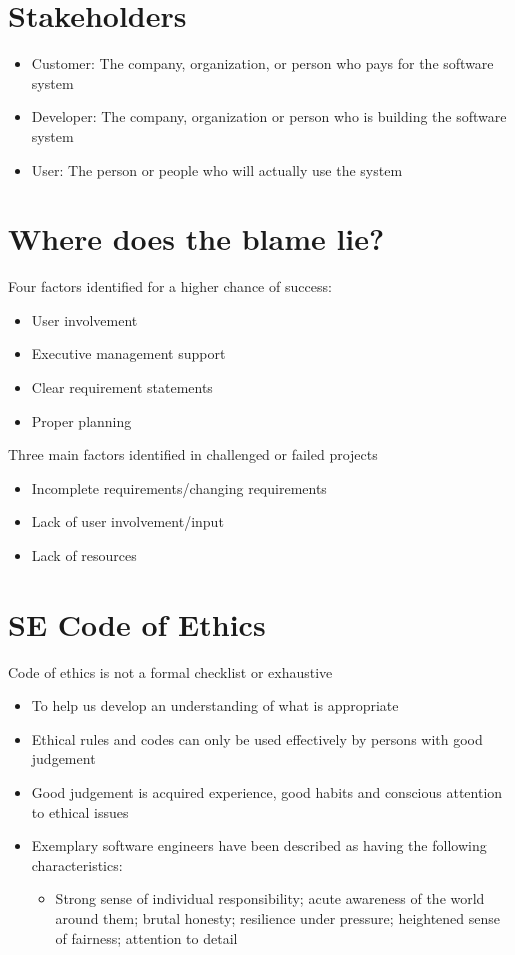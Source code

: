 \documentclass{article}[18pt]
\begin{document}
\section{Stakeholders}
\begin{itemize}
	\item Customer: The company, organization, or person who pays for the software system
	\item Developer: The company, organization or person who is building the software system
	\item User: The person or people who will actually use the system
\end{itemize}
\section{Where does the blame lie?}
Four factors identified for a higher chance of success:
\begin{itemize}
	\item User involvement
	\item Executive management support
	\item Clear requirement statements
	\item Proper planning
\end{itemize}
Three main factors identified in challenged or failed projects
\begin{itemize}
	\item Incomplete requirements/changing requirements
	\item Lack of user involvement/input
	\item Lack of resources
\end{itemize}
\section{SE Code of Ethics}
Code of ethics is not a formal checklist or exhaustive
\begin{itemize}
	\item To help us develop an understanding of what is appropriate
	\item Ethical rules and codes can only be used effectively by persons with good judgement
	\item Good judgement is acquired experience, good habits and conscious attention to ethical issues
	\item Exemplary software engineers have been described as having the following characteristics:
	\begin{itemize}
		\item Strong sense of individual responsibility; acute awareness of the world around them; brutal honesty; resilience under pressure; heightened sense of fairness; attention to detail
	\end{itemize}
\end{itemize}
\end{document}
